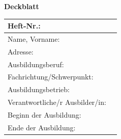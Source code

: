 \documentclass[a4paper,12pt]{article}
\begin{document}
\begin{center}
\large \textbf{Deckblatt}
\end{center}

\begin{center}
\begin{tabularx}{\linewidth}{|X|X|}
\hline
Heft-Nr.: & \hspace{5cm} \\
\hline
Name, Vorname: & \hspace{5cm} \\
\hline
Adresse: & \hspace{5cm} \\
\hline
Ausbildungsberuf: & \hspace{5cm} \\
\hline
Fachrichtung/Schwerpunkt: & \hspace{5cm} \\
\hline
Ausbildungsbetrieb: & \hspace{5cm} \\
\hline
Verantwortliche/r Ausbilder/in: & \hspace{5cm} \\
\hline
Beginn der Ausbildung: & \hspace{5cm} \\
\hline
Ende der Ausbildung: & \hspace{5cm} \\
\hline
\end{tabularx}
\end{center}
\end{document}
